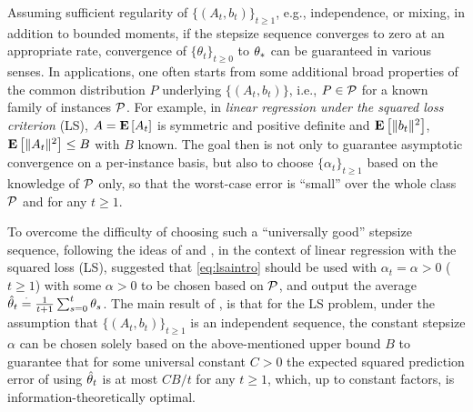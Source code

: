 Assuming sufficient regularity of $\{(A_t,b_t)\}_{t\ge 1}$, e.g., independence, or mixing, in addition to bounded moments, if the stepsize sequence converges to zero at an appropriate rate,
convergence of $\{\theta_t\}_{t\ge 0}$ to $\theta_*$ can be guaranteed in various senses. 
In applications, one often starts from some additional broad properties of the common distribution
$P$ underlying $\{(A_t,b_t)\}$, i.e., $P\in \mathcal{P}$ for a known family of instances $\mathcal{P}$.
For example, in \emph{linear regression under the squared loss criterion} (LS), 
$A= \mathbf{E}\left[A_t\right]$ is symmetric and positive definite and $\mathbf{E}\left[\| b_t\|^2\right]$, 
$\mathbf{E}\left[\| A_t\|^2\right]\le B$ with $B$ known.
The goal then is not only to guarantee asymptotic convergence on a per-instance basis, 
but also to choose $\{\alpha_t\}_{t\ge 1}$ based on the knowledge of $\mathcal{P}$ only, 
so that the worst-case error is  ``small'' 
over the whole class $\mathcal{P}$ and for any  $t\ge 1$.

To overcome the difficulty of choosing such a ``universally good'' stepsize sequence,
following the ideas of \citet{ruppert} and \citet{polyak-judisky},
in the context of linear regression with the squared loss (LS),
\citet{bach-moulines} suggested that
\eqref{eq:lsaintro} should be used with $\alpha_t=\alpha>0$ ($t\ge 1$) 
with some $\alpha>0$ to be chosen based on $\mathcal{P}$, 
and output the average $\hat{\theta}_t\stackrel{\cdot}{=}\frac{1}{t+1}\sum_{s=0}^t \theta_s$. 
The main result of 
\citet{bach-moulines}, 
is that for the LS problem, 
under the assumption that $\{(A_t,b_t)\}_{t\ge 1}$ is an independent sequence, 
the constant stepsize $\alpha$ can be chosen solely based on the above-mentioned 
upper bound $B$ to guarantee that for some universal constant $C>0$
the expected squared prediction error of using $\hat{\theta}_t$ is at most $C B/t$ for any $t\ge 1$,
which, up to constant factors, is information-theoretically optimal. 


